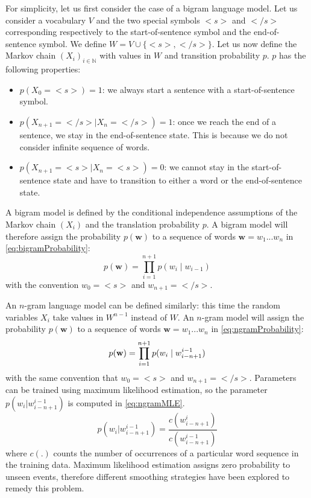 For simplicity, let us first consider the case of a bigram language model.
Let us consider a vocabulary $V$ and the two special symbols $<s>$ and $</s>$
corresponding respectively to the start-of-sentence symbol and the
end-of-sentence symbol. We define $W = V \cup \{<s>, </s>\}$. Let us now define
the Markov chain $(X_i)_{i \in \mathbb{N}}$ with values in $W$ and transition
probability $p$. $p$ has the following properties:
%
\begin{itemize}
  \item $p(X_0 = <s>) = 1$: we always start a sentence with a start-of-sentence
    symbol.
  \item $p(X_{n + 1} = </s> \mid X_n = </s>) = 1$: once we reach the end of a
    sentence, we stay in the end-of-sentence state. This is because we do not
    consider infinite sequence of words.
  \item $p(X_{n + 1} = <s> \mid X_n = <s>) = 0$: we cannot stay in the
    start-of-sentence state and have to transition to either a word or the
    end-of-sentence state.
\end{itemize}
%
A bigram model is defined by the conditional independence assumptions of the
Markov chain $(X_i)$ and the translation probability $p$. A bigram model will
therefore assign the probability $p(\bm{w})$ to a sequence of words
$\bm{w} = w_1...w_n$ in \autoref{eq:bigramProbability}:
%
\begin{equation}
  p(\bm{w}) = \prod_{i = 1}^{n+1} p(w_i \mid w_{i - 1})
  \label{eq:bigramProbability}
\end{equation}
%
with the convention $w_0 = <s>$ and $w_{n+1} = </s>$.

An $n$-gram language model can be defined similarly: this time the random
variables $X_i$ take values in $W^{n - 1}$ instead of $W$. An $n$-gram model %
will assign the probability $p(\bm{w})$ to a sequence of words
$\bm{w} = w_1...w_n$ in \autoref{eq:ngramProbability}:
%
\begin{equation}
  p({\bf w}) = \prod_{i=1}^{n + 1} p(w_i \mid w_{i-n+1}^{i-1})
  \label{eq:ngramProbability}
\end{equation}
%
with the same convention that $w_0 = <s>$ and $w_{n+1} = </s>$.
Parameters can be trained using maximum likelihood estimation, so the parameter
$p(w_i|w_{i-n+1}^{i-1})$ is computed in \autoref{eq:ngramMLE}.
%
\begin{equation}
  p(w_i|w_{i-n+1}^{i-1}) = \frac{c(w_{i-n+1}^{i})}{c(w_{i-n+1}^{i-1})}
  \label{eq:ngramMLE}
\end{equation}
%
where $c(.)$ counts the number of occurrences of a particular word sequence in
the training data. Maximum likelihood estimation assigns zero probability to
unseen events, therefore different smoothing strategies have been explored to
remedy this problem.

